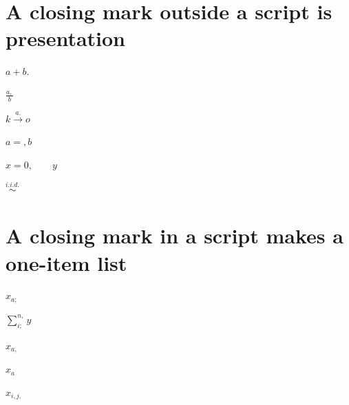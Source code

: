 \documentclass{article}
\begin{document}
\section{A closing mark outside a script is presentation}
$\boxed{a+b.}$

$\frac{a,}{b}$

$k\xrightarrow{a.}o$

$a\mathrel{=,}b$

$\boxed{x=0,}\qquad y$

$\overset{i.i.d.}{\sim}$

\section{A closing mark in a script makes a one-item list}
$x_{a;}$

$\sum_{i;}^{n,}y$

$x_{a,}$

$x_{a\qquad}$

$x_{i,j,}$
\end{document}
